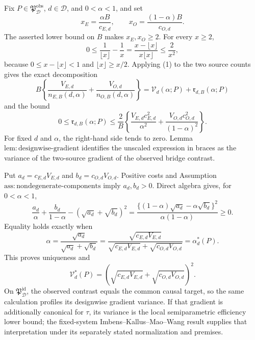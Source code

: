 Fix \(P\in\mathfrak P_{\mathcal D}^{\mathrm{obs}}\), \(d\in\mathcal D\), and \(0<\alpha<1\), and set
\[
 x_E=\frac{\alpha B}{c_{E,d}},\qquad
 x_O=\frac{(1-\alpha)B}{c_{O,d}}.
\]
The asserted lower bound on \(B\) makes \(x_E,x_O\ge2\).  For every \(x\ge2\),
\[
 0\le \frac1{\lfloor x\rfloor}-\frac1x
 =\frac{x-\lfloor x\rfloor}{x\lfloor x\rfloor}
 \le\frac2{x^2}, \tag{1}
\]
because \(0\le x-\lfloor x\rfloor<1\) and \(\lfloor x\rfloor\ge x/2\).  Applying (1) to the two source counts gives the exact decomposition
\[
 B\left\{\frac{V_{E,d}}{n_{E,B}(d,\alpha)}
 +\frac{V_{O,d}}{n_{O,B}(d,\alpha)}\right\}
 =\mathcal V_d(\alpha;P)+\mathfrak r_{d,B}(\alpha;P)
\]
and the bound
\[
 0\le\mathfrak r_{d,B}(\alpha;P)
 \le\frac2B\left\{
 \frac{V_{E,d}c_{E,d}^2}{\alpha^2}
 +\frac{V_{O,d}c_{O,d}^2}{(1-\alpha)^2}\right\}. \tag{2}
\]
For fixed \(d\) and \(\alpha\), the right-hand side tends to zero.  Lemma~\(\mathrm{lem{:}designwise\text{-}gradient}\) identifies the unscaled expression in braces as the variance of the two-source gradient of the observed bridge contrast.

Put \(a_d=c_{E,d}V_{E,d}\) and \(b_d=c_{O,d}V_{O,d}\).  Positive costs and Assumption~\(\mathrm{ass{:}nondegenerate\text{-}components}\) imply \(a_d,b_d>0\).  Direct algebra gives, for \(0<\alpha<1\),
\[
 \frac{a_d}{\alpha}+\frac{b_d}{1-\alpha}
 -(\sqrt{a_d}+\sqrt{b_d})^2
 =\frac{\{(1-\alpha)\sqrt{a_d}-\alpha\sqrt{b_d}\}^2}
 {\alpha(1-\alpha)}\ge0. \tag{3}
\]
Equality holds exactly when
\[
 \alpha=\frac{\sqrt{a_d}}{\sqrt{a_d}+\sqrt{b_d}}
 =\frac{\sqrt{c_{E,d}V_{E,d}}}
 {\sqrt{c_{E,d}V_{E,d}}+\sqrt{c_{O,d}V_{O,d}}}
 =\alpha_d^*(P).
\]
This proves uniqueness and
\[
 \mathcal V_d^*(P)
 =\left(\sqrt{c_{E,d}V_{E,d}}+\sqrt{c_{O,d}V_{O,d}}\right)^2.
\]
On \(\mathfrak P_{\mathcal D}^{\mathrm{id}}\), the observed contrast equals the common causal target, so the same calculation profiles its designwise gradient variance.  If that gradient is additionally canonical for \(\tau\), its variance is the local semiparametric efficiency lower bound; the fixed-system Imbens--Kallus--Mao--Wang result supplies that interpretation under its separately stated normalization and premises.